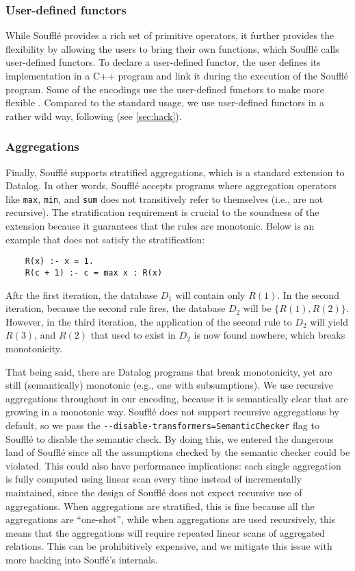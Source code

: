 \subsubsection*{User-defined functors}
While Souffl\'e provides a rich set of primitive operators,
 it further provides the flexibility by allowing the users
 to bring their own functions, which Souffl\'e calls
 user-defined functors.
To declare a user-defined functor, 
 the user defines its implementation in a C++ program and
 link it during the execution of the Souffl\'e program.
Some of the encodings use the user-defined functors 
 to make \eqrel{} more flexible \citep{zucker-udf-1,zucker-udf-2}.
Compared to the standard usage, 
 we use user-defined functors in a rather wild way, 
 following \citet{zucker-udf-1} (see \autoref{sec:hack}).

\subsubsection*{Aggregations}
Finally, Souffl\'e supports stratified aggregations, 
 which is a standard extension to Datalog.
In other words, 
 Souffl\'e accepts programs where 
 aggregation operators like \texttt{max}, \texttt{min}, and \texttt{sum}
 does not transitively refer to themselves (i.e., are not recursive).
The stratification requirement is crucial to the soundness of the extension
 because it guarantees that the rules are monotonic.
Below is an example that does not satisfy the stratification:
\begin{verbatim}
    R(x) :- x = 1.
    R(c + 1) :- c = max x : R(x)
\end{verbatim}
Aftr the first iteration, the database $D_1$ will contain only $R(1)$. 
In the second iteration, because the second rule fires,
 the database $D_2$ will be $\{R(1), R(2)\}$.
However, in the third iteration,
 the application of the second rule to $D_2$ will yield
 $R(3)$, and $R(2)$ that used to exist in $D_2$ is now found nowhere,
 which breaks monotonicity.

That being said, there are Datalog programs that break monotonicity,
 yet are still (semantically) monotonic (e.g., one with subsumptions).
We use recursive aggregations 
 throughout in our encoding, because it is semantically clear that 
 \egraphs are growing in a monotonic way.
Souffl\'e does not support recursive aggregations by default,
 so we pass the \verb|--disable-transformers=SemanticChecker|
 flag to Souffl\'e to disable the semantic check.
By doing this, 
 we entered the dangerous land of Souffl\'e 
 since all the assumptions checked by the semantic checker
 could be violated.
This could also have performance implications:
each single aggregation is fully computed using linear scan every time 
 instead of incrementally maintained,
 since the design of Souffl\'e does not expect
 recursive use of aggregations.
When aggregations are stratified,
 this is fine because all the aggregations are ``one-shot'',
 while when aggregations are used recursively, 
 this means that the aggregations
 will require repeated linear scans of aggregated relations.
This can be prohibitively expensive, 
 and we mitigate this issue with more hacking into Souff\'e's internals.

